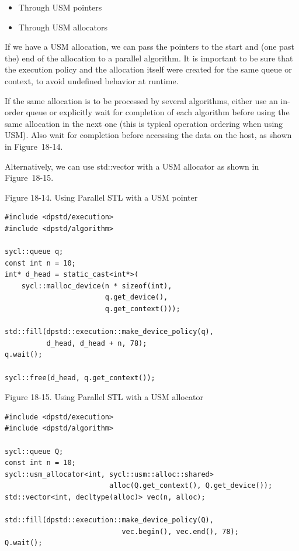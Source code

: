 \begin{itemize}
	\item Through USM pointers
	\item Through USM allocators
\end{itemize}

If we have a USM allocation, we can pass the pointers to the start and (one past the) end of the allocation to a parallel algorithm. It is important to be sure that the execution policy and the allocation itself were created for the same queue or context, to avoid undefined behavior at runtime.\par

If the same allocation is to be processed by several algorithms, either use an in-order queue or explicitly wait for completion of each algorithm before using the same allocation in the next one (this is typical operation ordering when using USM). Also wait for completion before accessing the data on the host, as shown in Figure 18-14.\par

Alternatively, we can use std::vector with a USM allocator as shown in Figure 18-15.\par

\hspace*{\fill} \par %
Figure 18-14. Using Parallel STL with a USM pointer
\begin{lstlisting}[caption={}]
#include <dpstd/execution>
#include <dpstd/algorithm>

sycl::queue q;
const int n = 10;
int* d_head = static_cast<int*>(
	sycl::malloc_device(n * sizeof(int),
						q.get_device(), 
						q.get_context()));
						
std::fill(dpstd::execution::make_device_policy(q),
		  d_head, d_head + n, 78);
q.wait();

sycl::free(d_head, q.get_context());
\end{lstlisting}

\hspace*{\fill} \par %
Figure 18-15. Using Parallel STL with a USM allocator
\begin{lstlisting}[caption={}]
#include <dpstd/execution>
#include <dpstd/algorithm>

sycl::queue Q;
const int n = 10;
sycl::usm_allocator<int, sycl::usm::alloc::shared> 
						 alloc(Q.get_context(), Q.get_device());
std::vector<int, decltype(alloc)> vec(n, alloc);

std::fill(dpstd::execution::make_device_policy(Q), 
							vec.begin(), vec.end(), 78);
Q.wait();
\end{lstlisting}

